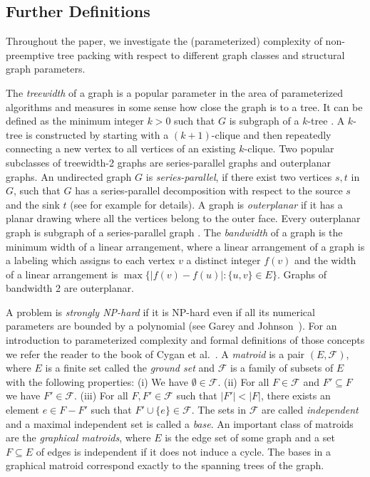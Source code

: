 \documentclass[runningheads]{llncs}
\newcommand{\set}[1]{\{ #1 \}}
\newcommand{\lasse}[1]{#1}
\begin{document}
\subsection{\lasse{Further Definitions}}

\lasse{Throughout the paper, we investigate the (parameterized) complexity of non-preemptive tree packing 
with respect to different graph classes and structural graph parameters.}

\lasse{The \emph{treewidth} of a graph is a popular parameter in the area of parameterized algorithms and measures in some sense how close the graph is to a tree. It can be defined as the minimum integer $k > 0$ such that $G$ is subgraph of a $k$-tree \cite{bodlaender1998partial}. A $k$-tree is constructed by starting with a $(k +1)$-clique and then repeatedly
connecting a new vertex to all vertices of an existing $k$-clique.
Two popular subclasses of treewidth-2 graphs are series-parallel graphs and outerplanar graphs. An undirected graph $G$ is \emph{series-parallel}, if there exist two vertices $s,t$ in $G$, such that $G$ has a series-parallel decomposition with respect to the source $s$ and the sink $t$ (see for example \cite[p. 22]{bodlaender1998partial} for details).  A graph is \emph{outerplanar} if it has a planar drawing where all the vertices belong to the outer face. Every outerplanar graph is subgraph of a series-parallel graph  \cite{bodlaender1998partial}.
The \emph{bandwidth} of a graph is the minimum width of a linear arrangement, where a linear arrangement of a graph is a labeling which assigns to each vertex $v$ a distinct integer $f(v)$ and the width of a linear arrangement is $\max\set{|f(v)-f(u)| : \set{u,v} \in E}$. Graphs of bandwidth 2 are outerplanar.}

\lasse{A problem is \emph{strongly NP-hard} if it is NP-hard even if all its numerical parameters are bounded by a polynomial (see Garey and Johnson~\cite{garey1979computers}).
For an introduction to parameterized complexity and formal definitions of those concepts 
we refer the reader to the book of Cygan et al.~\cite{cygan2015parameterized}.}
\lasse{A \emph{matroid} is a pair $(E,\mathcal{F})$, where $E$ is a finite set called the \emph{ground set} and $\mathcal{F}$ is a family of subsets of $E$ with the following properties: (i) We have $\emptyset \in \mathcal{F}$. (ii) For all $F \in \mathcal{F}$ and $F' \subseteq F$ we have $F' \in \mathcal{F}$. (iii) For all $F,F' \in \mathcal{F}$ such that $|F'| < |F|$, there exists an element $e \in F - F'$ such that $F' \cup \set{e} \in \mathcal{F}$. The sets in $\mathcal{F}$ are called \emph{independent} and a maximal independent set is called a \emph{base}. An important class of matroids are the \emph{graphical matroids}, where $E$ is the edge set of some graph and a set $F \subseteq E$ of edges is independent if it does not induce a cycle. The bases in a graphical matroid correspond exactly to the spanning trees of the graph.
}
\end{document}
